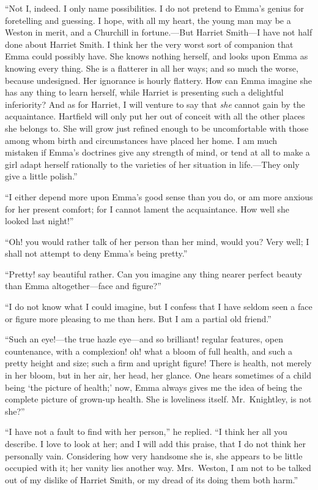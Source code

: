 ``Not I, indeed.  I only name possibilities.  I do not pretend to Emma's
genius for foretelling and guessing.  I hope, with all my heart,
the young man may be a Weston in merit, and a Churchill in fortune.---But
Harriet Smith---I have not half done about Harriet Smith.  I think
her the very worst sort of companion that Emma could possibly have.
She knows nothing herself, and looks upon Emma as knowing every thing.
She is a flatterer in all her ways; and so much the worse,
because undesigned.  Her ignorance is hourly flattery.  How can
Emma imagine she has any thing to learn herself, while Harriet
is presenting such a delightful inferiority? And as for Harriet,
I will venture to say that \emph{she} cannot gain by the acquaintance.
Hartfield will only put her out of conceit with all the other places
she belongs to.  She will grow just refined enough to be uncomfortable
with those among whom birth and circumstances have placed her home.
I am much mistaken if Emma's doctrines give any strength of mind,
or tend at all to make a girl adapt herself rationally to the varieties
of her situation in life.---They only give a little polish.''

``I either depend more upon Emma's good sense than you do, or am more
anxious for her present comfort; for I cannot lament the acquaintance.
How well she looked last night!''

``Oh! you would rather talk of her person than her mind, would you?
Very well; I shall not attempt to deny Emma's being pretty.''

``Pretty! say beautiful rather.  Can you imagine any thing nearer
perfect beauty than Emma altogether---face and figure?''

``I do not know what I could imagine, but I confess that I have
seldom seen a face or figure more pleasing to me than hers.
But I am a partial old friend.''

``Such an eye!---the true hazle eye---and so brilliant! regular features,
open countenance, with a complexion! oh! what a bloom of full health,
and such a pretty height and size; such a firm and upright figure!
There is health, not merely in her bloom, but in her air, her head,
her glance.  One hears sometimes of a child being `the picture
of health;' now, Emma always gives me the idea of being the complete
picture of grown-up health.  She is loveliness itself.  Mr.\ Knightley,
is not she?''

``I have not a fault to find with her person,'' he replied.
``I think her all you describe.  I love to look at her; and I
will add this praise, that I do not think her personally vain.
Considering how very handsome she is, she appears to be little
occupied with it; her vanity lies another way.  Mrs.\ Weston, I am
not to be talked out of my dislike of Harriet Smith, or my dread
of its doing them both harm.''

